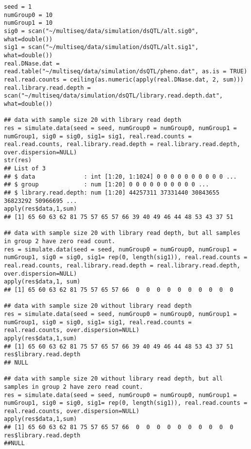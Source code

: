\documentclass[11pt]{article}
\begin{document}
\begin{lstlisting}
seed = 1
numGroup0 = 10
numGroup1 = 10
sig0 = scan("~/multiseq/data/simulation/dsQTL/alt.sig0", what=double())
sig1 = scan("~/multiseq/data/simulation/dsQTL/alt.sig1", what=double())
real.DNase.dat = read.table("~/multiseq/data/simulation/dsQTL/pheno.dat", as.is = TRUE)
real.read.counts = ceiling(as.numeric(apply(real.DNase.dat, 2, sum)))
real.library.read.depth = scan("~/multiseq/data/simulation/dsQTL/library.read.depth.dat", what=double())

## data with sample size 20 with library read depth 
res = simulate.data(seed = seed, numGroup0 = numGroup0, numGroup1 = numGroup1, sig0 = sig0, sig1= sig1, real.read.counts = real.read.counts, real.library.read.depth = real.library.read.depth, over.dispersion=NULL)
str(res)
## List of 3
## $ data              : int [1:20, 1:1024] 0 0 0 0 0 0 0 0 0 0 ...
## $ group             : num [1:20] 0 0 0 0 0 0 0 0 0 0 ...
## $ library.read.depth: num [1:20] 44257311 37331440 30843655 36823292 50966695 ...
apply(res$data,1,sum)
## [1] 65 60 63 62 81 75 57 65 57 66 39 40 49 46 44 48 53 43 37 51

## data with sample size 20 with library read depth, but all samples in group 2 have zero read count.
res = simulate.data(seed = seed, numGroup0 = numGroup0, numGroup1 = numGroup1, sig0 = sig0, sig1= rep(0, length(sig1)), real.read.counts = real.read.counts, real.library.read.depth = real.library.read.depth, over.dispersion=NULL)
apply(res$data,1, sum)
## [1] 65 60 63 62 81 75 57 65 57 66  0  0  0  0  0  0  0  0  0  0

## data with sample size 20 without library read depth
res = simulate.data(seed = seed, numGroup0 = numGroup0, numGroup1 = numGroup1, sig0 = sig0, sig1= sig1, real.read.counts = real.read.counts, over.dispersion=NULL)
apply(res$data,1,sum)
## [1] 65 60 63 62 81 75 57 65 57 66 39 40 49 46 44 48 53 43 37 51
res$library.read.depth
## NULL

## data with sample size 20 without library read depth, but all samples in group 2 have zero read count.
res = simulate.data(seed = seed, numGroup0 = numGroup0, numGroup1 = numGroup1, sig0 = sig0, sig1= rep(0, length(sig1)), real.read.counts = real.read.counts, over.dispersion=NULL)
apply(res$data,1,sum)
## [1] 65 60 63 62 81 75 57 65 57 66  0  0  0  0  0  0  0  0  0  0
res$library.read.depth
##NULL
\end{lstlisting}
\end{document}
